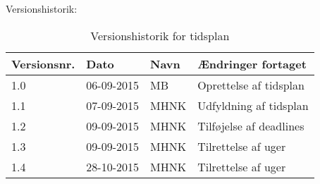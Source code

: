 \documentclass[landscape, 12pt, letterpaper]{article}
\begin{document}
\begin{table}[]
Versionshistorik:
\centering
\caption{Versionshistorik for tidsplan}
\label{my-label}
\begin{tabular}{|l|l|l|l|}
\hline
Versionsnr. & Dato       & Navn & Ændringer fortaget     \\ \hline
1.0         & 06-09-2015 & MB   & Oprettelse af tidsplan \\ \hline
1.1         & 07-09-2015 & MHNK & Udfyldning af tidsplan \\ \hline
1.2         & 09-09-2015 & MHNK & Tilføjelse af deadlines\\ \hline
1.3         & 09-09-2015 & MHNK & Tilrettelse af uger    \\ \hline
1.4         & 28-10-2015 & MHNK & Tilrettelse af uger    \\ \hline
\end{tabular}
\end{table}
\end{document}
